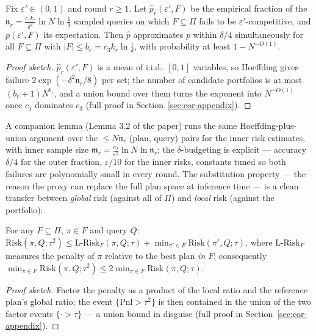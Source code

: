 \begin{lemma}\label{lem:cor-qo-hoeffding}
Fix $\varepsilon' \in (0,1)$ and round $r \ge 1$. Let
$\hat{p}_r(\varepsilon', F)$ be the empirical fraction of the
$\mathfrak{n}_r = \tfrac{c_1 k_r}{\delta^2}\ln N \ln\tfrac1\delta$
sampled queries on which $F \subseteq \Pi$ fails to be
$\varepsilon'$-competitive, and $p(\varepsilon',F)$ its expectation.
Then $\hat{p}$ approximates $p$ within $\delta/4$ simultaneously for
all $F \subseteq \Pi$ with $|F| \le b_r = c_3 k_r \ln\frac1\delta$,
with probability at least $1 - N^{-O(1)}$. \eop
\end{lemma}

\begin{proof}[Proof sketch]
$\hat{p}_r(\varepsilon',F)$ is a mean of i.i.d.\ $[0,1]$ variables, so
Hoeffding gives failure $2\exp(-\delta^2 \mathfrak{n}_r/8)$ per set;
the number of candidate portfolios is at most $(b_r+1)N^{b_r}$, and a
union bound over them turns the exponent into $N^{-O(1)}$ once $c_1$
dominates $c_3$ (full proof in Section~\ref{sec:cor-appendix}).
\end{proof}

A companion lemma (Lemma 3.2 of the paper) runs the same
Hoeffding-plus-union argument over the $\le N\mathfrak{n}_r$ (plan,
query) pairs for the inner risk estimates, with inner sample size
$\mathfrak{m}_r = \tfrac{c_2}{\varepsilon^2}\ln N \ln
\mathfrak{n}_r$; the $\delta$-budgeting is explicit --- accuracy
$\delta/4$ for the outer fraction, $\varepsilon/10$ for the inner
risks, constants tuned so both failures are polynomially small in every
round. The substitution property --- the reason the proxy can replace
the full plan space at inference time --- is a clean transfer between
\emph{global} risk (against all of $\Pi$) and \emph{local} risk
(against the portfolio):

\begin{lemma}\label{lem:cor-qo-transfer}
For any $F \subseteq \Pi$, $\pi \in F$ and query $Q$:
$\mathrm{Risk}(\pi, Q; \tau^2) \le \mathrm{L\text{-}Risk}_{F}(\pi,
Q;\tau) + \min_{\pi' \in F}\mathrm{Risk}(\pi', Q;\tau)$, where
$\mathrm{L\text{-}Risk}_F$ measures the penalty of $\pi$ relative to
the best plan \emph{in $F$}; consequently $\min_{\pi \in
F}\mathrm{Risk}(\pi,Q;\tau^2) \le 2\min_{\pi\in
F}\mathrm{Risk}(\pi,Q;\tau)$. \eop
\end{lemma}

\begin{proof}[Proof sketch]
Factor the penalty as a product of the local ratio and the reference
plan's global ratio; the event $\{\mathrm{Pnl} > \tau^2\}$ is then
contained in the union of the two factor events $\{\cdot > \tau\}$ ---
a union bound in disguise (full proof in
Section~\ref{sec:cor-appendix}).
\end{proof}

